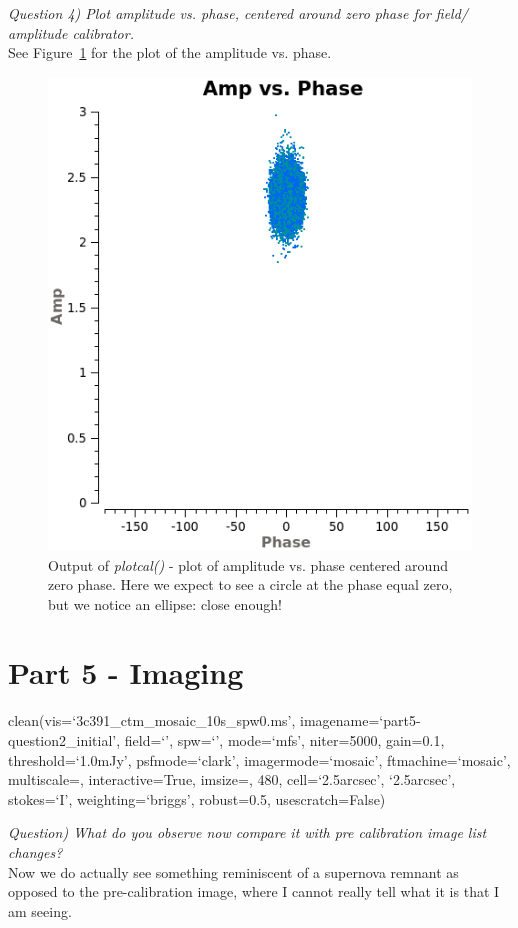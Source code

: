 \documentclass[12pt, a4paper]{article}
\begin{document}
\noindent \textit{Question 4) Plot amplitude vs. phase, centered around zero phase for field/ amplitude calibrator.} \\
See Figure~\ref{fig:part4subH-ellips} for the plot of the amplitude vs. phase. 
\begin{figure}[h!]
    \centering
    \includegraphics[scale=0.5]{../Imaging/plots/part4-subH-question4_fld1-corrected-ampvsphase.png}
    \caption{Output of \emph{plotcal()} - plot of amplitude vs. phase centered around zero phase. Here we expect to see a circle at the phase equal zero, but we notice an ellipse: close enough! \label{fig:part4subH-ellips}}
\end{figure}

\section{Part 5 - Imaging}
{\tiny clean(vis=`3c391\_ctm\_mosaic\_10s\_spw0.ms', imagename=`part5-question2\_initial', field=`', spw=`', mode=`mfs', niter=5000, gain=0.1, threshold=`1.0mJy', psfmode=`clark', imagermode=`mosaic', ftmachine=`mosaic', multiscale=\rbrack, interactive=True, imsize=, 480\rbrack, cell=\lbrack `2.5arcsec', `2.5arcsec'\rbrack, stokes=`I', weighting=`briggs', robust=0.5, usescratch=False) }

\noindent \textit{Question) What do you observe now compare it with pre calibration image list changes?} \\
Now we do actually see something reminiscent of a supernova remnant as opposed to the pre-calibration image, where I cannot really tell what it is that I am seeing.
\end{document}
